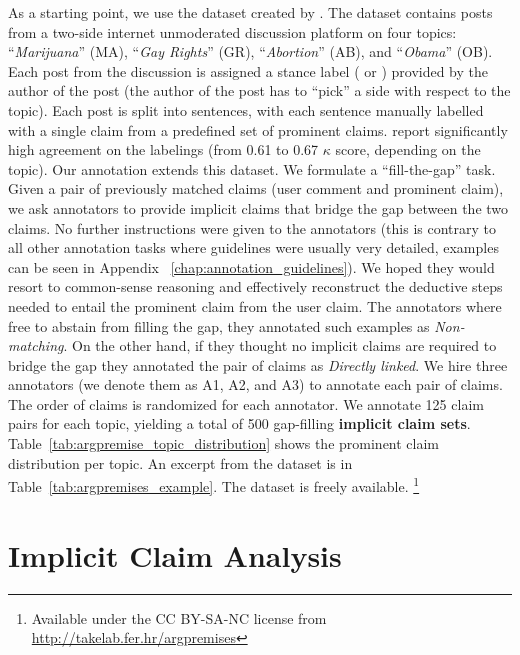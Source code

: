As a starting point, we use the dataset created by
\citet{hasan2014you}. 
The dataset contains posts from a two-side internet unmoderated discussion platform 
on four topics: ``\emph{Marijuana}'' (MA), ``\emph{Gay Rights}'' (GR), 
``\emph{Abortion}'' (AB), and ``\emph{Obama}'' (OB).
Each post from the discussion is assigned a stance label ( or ) 
provided by the author of the post (the author of the post has to ``pick'' a side 
with respect to the topic). 
Each post is split into sentences, with each sentence manually
labelled with a single claim from a predefined set of prominent
claims. 
\citet{hasan2014you} report significantly high agreement on the labelings
(from 0.61 to 0.67 $\kappa$ score, depending on the topic). 
Our annotation extends this dataset. 
We formulate a ``fill-the-gap'' task. 
Given a pair of previously matched claims (user comment and 
prominent claim), we ask annotators to provide implicit claims that bridge the gap 
between the two claims. 
No further instructions were given to the annotators (this is contrary to all other
annotation tasks where guidelines were usually very detailed, examples can be seen in Appendix
~\ref{chap:annotation_guidelines}). 
We hoped they would resort to common-sense reasoning and effectively 
reconstruct the deductive steps needed to entail the prominent claim from the user
claim.
The annotators where free to abstain from filling the gap, they
annotated such examples as \emph{Non-matching}. 
On the other hand, if they thought no implicit claims are required
to bridge the gap they annotated the pair of claims as \emph{Directly linked}. 
We hire three annotators (we denote them as A1, A2, and A3) to annotate each pair of claims. 
The order of claims is randomized for each annotator. 
We annotate 125 claim pairs for each topic, yielding a total of 500 gap-filling
\textbf{implicit claim sets}. 
Table~\ref{tab:argpremise_topic_distribution} shows the prominent claim distribution per topic. 
An excerpt from the dataset is in Table~\ref{tab:argpremises_example}. 
The dataset is freely available. \footnote{Available under the CC BY-SA-NC license from
\url{http://takelab.fer.hr/argpremises}}

\section{Implicit Claim Analysis}
\label{sec:argpremise_analysis}

